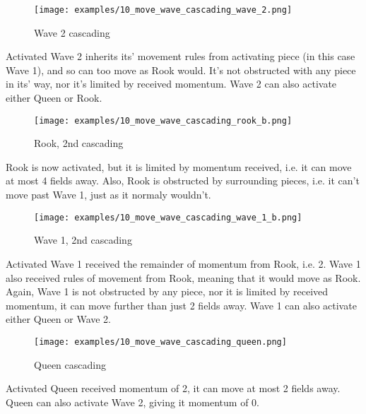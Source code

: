 \noindent
\begin{wrapfigure}[11]{l}{0.5625\textwidth}
\texttt{[image: examples/10\_move\_wave\_cascading\_wave\_2.png]}
\caption{Wave 2 cascading}
\label{fig:10_move_wave_cascading_wave_2}
\end{wrapfigure}
Activated Wave 2 inherits its' movement rules from activating piece (in this
case Wave 1), and so can too move as Rook would. It's not obstructed with any
piece in its' way, nor it's limited by received momentum. Wave 2 can also
activate either Queen or Rook.

\vspace*{0.125\textheight}
\noindent
\begin{wrapfigure}[9]{r}{0.5625\textwidth}
\texttt{[image: examples/10\_move\_wave\_cascading\_rook\_b.png]}
\caption{Rook, 2nd cascading}
\label{fig:10_move_wave_cascading_rook_b}
\end{wrapfigure}
Rook is now activated, but it is limited by momentum received, i.e. it can
move at most 4 fields away. Also, Rook is obstructed by surrounding pieces,
i.e. it can't move past Wave 1, just as it normaly wouldn't.

\clearpage %

\noindent
\begin{wrapfigure}[15]{l}{0.5625\textwidth}
\texttt{[image: examples/10\_move\_wave\_cascading\_wave\_1\_b.png]}
\caption{Wave 1, 2nd cascading}
\label{fig:10_move_wave_cascading_wave_1_b}
\end{wrapfigure}
Activated Wave 1 received the remainder of momentum from Rook, i.e. 2.
Wave 1 also received rules of movement from Rook, meaning that it would
move as Rook. Again, Wave 1 is not obstructed by any piece, nor it is
limited by received momentum, it can move further than just 2 fields away.
Wave 1 can also activate either Queen or Wave 2.

\vspace*{0.01\textheight}
\noindent
\begin{wrapfigure}[10]{r}{0.5625\textwidth}
\texttt{[image: examples/10\_move\_wave\_cascading\_queen.png]}
\caption{Queen cascading}
\label{fig:10_move_wave_cascading_queen}
\end{wrapfigure}
Activated Queen received momentum of 2, it can move at most 2 fields away.
Queen can also activate Wave 2, giving it momentum of 0.

